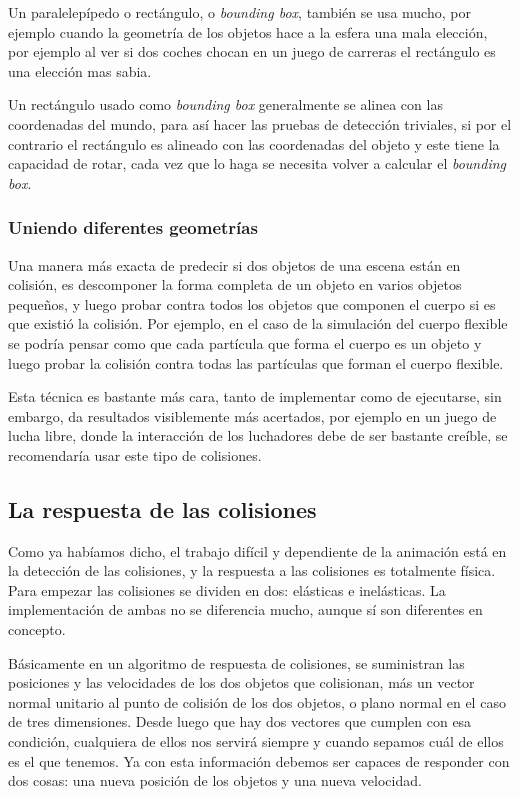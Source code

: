 Un paralelepípedo o rectángulo, o \emph{\textenglish{bounding box}}, también se usa mucho, por ejemplo cuando la geometría de los objetos hace a la esfera una mala elección, por ejemplo al ver si dos coches chocan en un juego de carreras el rectángulo es una elección mas sabia.

Un rectángulo usado como \emph{\textenglish{bounding box}} generalmente se alinea con las coordenadas del mundo, para así hacer las pruebas de detección triviales, si  por el contrario el rectángulo es alineado con las coordenadas del objeto y este tiene la capacidad de rotar, cada vez que lo haga se necesita volver a calcular el \emph{\textenglish{bounding box}}.

\subsubsection{Uniendo diferentes geometrías}
Una manera más exacta de predecir si dos objetos de una escena están en colisión, es descomponer la forma completa de un objeto en varios objetos pequeños, y luego probar contra todos los objetos que componen el cuerpo si es que existió la colisión.
Por ejemplo, en el caso de la simulación del cuerpo flexible se podría pensar como que cada partícula que forma el cuerpo es un objeto y luego probar la colisión contra todas las partículas que forman el cuerpo flexible.

Esta técnica es bastante más cara, tanto de implementar como de ejecutarse, sin embargo, da resultados visiblemente más acertados, por ejemplo en un juego de lucha libre, donde la interacción de los luchadores debe de ser bastante creíble, se recomendaría usar este tipo de colisiones.

\subsection{La respuesta de las colisiones}

Como ya habíamos dicho, el trabajo difícil y dependiente de la animación está en la detección de las colisiones, y la respuesta a las colisiones es totalmente física.
Para empezar las colisiones se dividen en dos: elásticas e inelásticas.
La implementación de ambas no se diferencia mucho, aunque sí son diferentes en concepto.

Básicamente en un algoritmo de respuesta de colisiones, se suministran las posiciones y las velocidades de los dos objetos que colisionan, más un vector normal unitario al punto de colisión de los dos objetos, o plano normal en el caso de tres dimensiones.
Desde luego que hay dos vectores que cumplen con esa condición, cualquiera de ellos nos servirá siempre y cuando sepamos cuál de ellos es el que tenemos.
Ya con esta información debemos ser capaces de responder con dos cosas: una nueva posición de los objetos y una nueva velocidad.


